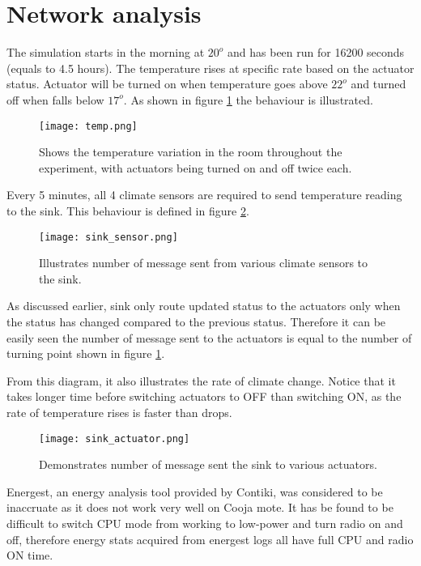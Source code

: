 \documentclass[12pt, oneside, a4paper]{article}
\begin{document}
    \section{Network analysis}

    The simulation starts in the morning at \(20^{o}\) and has been run for 16200 seconds (equals to 4.5 hours). The temperature rises at specific rate based on the actuator status. Actuator will be turned on when temperature goes above \(22^{o}\) and turned off when falls below \(17^{o}\). As shown in figure \ref{temp} the behaviour is illustrated.

    \begin{figure}[H]
        \centering
        \texttt{[image: temp.png]}
        \caption{Shows the temperature variation in the room throughout the experiment, with actuators being turned on and off twice each.}
        \label{temp}
    \end{figure}

    Every 5 minutes, all 4 climate sensors are required to send temperature reading to the sink. This behaviour is defined in figure \ref{sensor_sink}.

    \begin{figure}[H]
        \centering
        \texttt{[image: sink\_sensor.png]}
        \caption{Illustrates number of message sent from various climate sensors to the sink.}
        \label{sensor_sink}
    \end{figure}

    As discussed earlier, sink only route updated status to the actuators only when the status has changed compared to the previous status. Therefore it can be easily seen the number of message sent to the actuators is equal to the number of turning point shown in figure \ref{temp}.

    From this diagram, it also illustrates the rate of climate change. Notice that it takes longer time before switching actuators to OFF than switching ON, as the rate of temperature rises is faster than drops.

    \begin{figure}[H]
        \centering
        \texttt{[image: sink\_actuator.png]}
        \caption{Demonstrates number of message sent the sink to various actuators.}
    \end{figure}

    Energest, an energy analysis tool provided by Contiki, was considered to be inaccruate as it does not work very well on Cooja mote. It has be found to be difficult to switch CPU mode from working to low-power and turn radio on and off, therefore energy stats acquired from energest logs all have full CPU and radio ON time.
\end{document}
